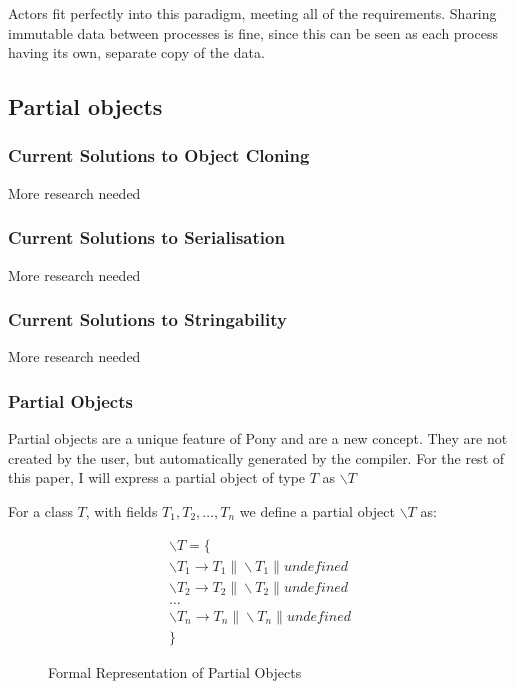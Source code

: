 \documentclass{article}
\begin{document}
Actors fit perfectly into this paradigm, meeting all of the requirements.
Sharing immutable data between processes is fine, since this can be seen as each
process having its own, separate copy of the data.

\subsection{Partial objects}

\subsubsection{Current Solutions to Object Cloning}

More research needed

\subsubsection{Current Solutions to Serialisation}

More research needed

\subsubsection{Current Solutions to Stringability}

More research needed

\subsubsection{Partial Objects}

Partial objects are a unique feature of Pony and are a new concept. They are not
created by the user, but automatically generated by the compiler. For the rest
of this paper, I will express a partial object of type $T$
as $\backslash T$

For a class $T$, with fields $T_{1}, T_{2}, \dots , T_{n}$ we define a partial
object $\backslash T$ as:

\begin{figure}[H]
\begin{align*}
\backslash T  = \{\\
	\backslash T_{1} \to T_{1} \| \backslash T_{1} \| undefined\\
	\backslash T_{2} \to T_{2} \| \backslash T_{2} \| undefined\\
	\dots\\
	\backslash T_{n} \to T_{n} \| \backslash T_{n} \| undefined\\
\}
\end{align*}
\caption{Formal Representation of Partial Objects}
\end{figure}
\end{document}
